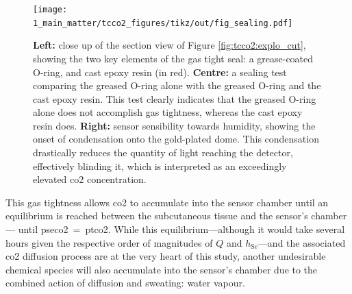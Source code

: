 \begin{figure}
	\centering
	\texttt{[image: 1\_main\_matter/tcco2\_figures/tikz/out/fig\_sealing.pdf]}
	\caption[Sensor sealing analysis.]{\textbf{Left:} close up of the section view of Figure \ref{fig:tcco2:explo_cut}, showing the two key elements of the gas tight seal: a grease-coated O-ring, and cast epoxy resin (in red). \textbf{Centre:} a sealing test comparing the greased O-ring alone with the greased O-ring and the cast epoxy resin. This test clearly indicates that the greased O-ring alone does not accomplish gas tightness, whereas the cast epoxy resin does. \textbf{Right:} sensor sensibility towards humidity, showing the onset of condensation onto the gold-plated dome. This condensation drastically reduces the quantity of light reaching the detector, effectively blinding it, which is interpreted as an exceedingly elevated \gls{co2} concentration.}\label{fig:tcco2:gas_tightness}
\end{figure}

This gas tightness allows \gls{co2} to accumulate into the sensor chamber until an equilibrium is reached between the subcutaneous tissue and the sensor's chamber---\ie{} until \gls{pseco2}~=~\gls{ptco2}. While this equilibrium---although it would take several hours given the respective order of magnitudes of $Q$ and $h_\text{Se}$---and the associated \gls{co2} diffusion process are at the very heart of this study, another undesirable chemical species will also accumulate into the sensor's chamber due to the combined action of diffusion and sweating: water vapour.

